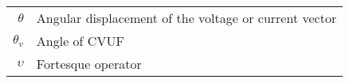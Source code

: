 \begin{scriptsize}
\begin{tabularx}{\textwidth}{r|X}
$\theta$                    & Angular displacement of the voltage or current vector\\
$\theta_v$  											& Angle of CVUF\\
$\upsilon$  											& Fortesque operator\\

\end{tabularx}
\end{scriptsize}

